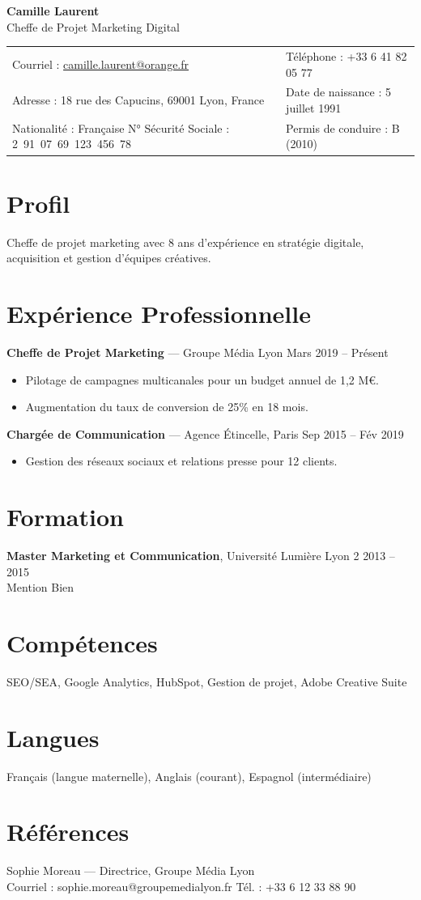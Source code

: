 \documentclass[11pt,a4paper]{article}
\begin{document}
{\Huge\bfseries\color{accent} Camille Laurent}\\[0.3em]
{\large Cheffe de Projet Marketing Digital}\\[0.6em]
\begin{tabularx}{\linewidth}{@{}lX@{}}
Courriel : \href{mailto:camille.laurent@orange.fr}{camille.laurent@orange.fr} &
Téléphone : +33 6 41 82 05 77 \\
Adresse : 18 rue des Capucins, 69001 Lyon, France &
Date de naissance : 5 juillet 1991 \\
Nationalité : Française \quad N° Sécurité Sociale : 2~91~07~69~123~456~78 &
Permis de conduire : B (2010) \\
\end{tabularx}

\section{Profil}
Cheffe de projet marketing avec 8 ans d'expérience en stratégie digitale,
acquisition et gestion d'équipes créatives.

\section{Expérience Professionnelle}
\textbf{Cheffe de Projet Marketing} — Groupe Média Lyon \hfill Mars 2019 -- Présent
\begin{itemize}
  \item Pilotage de campagnes multicanales pour un budget annuel de 1,2 M€.
  \item Augmentation du taux de conversion de 25\% en 18 mois.
\end{itemize}
\vspace{0.4em}
\textbf{Chargée de Communication} — Agence Étincelle, Paris \hfill Sep 2015 -- Fév 2019
\begin{itemize}
  \item Gestion des réseaux sociaux et relations presse pour 12 clients.
\end{itemize}

\section{Formation}
\textbf{Master Marketing et Communication}, Université Lumière Lyon 2 \hfill 2013 -- 2015\\
Mention Bien

\section{Compétences}
SEO/SEA, Google Analytics, HubSpot, Gestion de projet, Adobe Creative Suite

\section{Langues}
Français (langue maternelle), Anglais (courant), Espagnol (intermédiaire)

\section{Références}
Sophie Moreau — Directrice, Groupe Média Lyon\\
Courriel : sophie.moreau@groupemedialyon.fr \quad Tél. : +33 6 12 33 88 90
\end{document}

